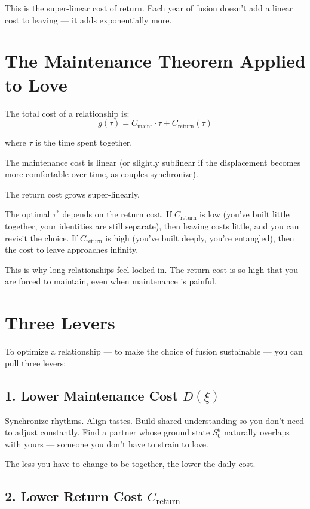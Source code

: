 \documentclass[12pt]{article}
\begin{document}
This is the super-linear cost of return. Each year of fusion doesn't add a linear cost to leaving — it adds exponentially more.

\section{The Maintenance Theorem Applied to Love}

The total cost of a relationship is:
\[
g(\tau) = C_{\text{maint}} \cdot \tau + C_{\text{return}}(\tau)
\]

where $\tau$ is the time spent together.

The maintenance cost is linear (or slightly sublinear if the displacement becomes more comfortable over time, as couples synchronize).

The return cost grows super-linearly.

The optimal $\tau^*$ depends on the return cost. If $C_{\text{return}}$ is low (you've built little together, your identities are still separate), then leaving costs little, and you can revisit the choice. If $C_{\text{return}}$ is high (you've built deeply, you're entangled), then the cost to leave approaches infinity.

This is why long relationships feel locked in. The return cost is so high that you are forced to maintain, even when maintenance is painful.

\section{Three Levers}

To optimize a relationship — to make the choice of fusion sustainable — you can pull three levers:

\subsection{1. Lower Maintenance Cost $D(\xi)$}

Synchronize rhythms. Align tastes. Build shared understanding so you don't need to adjust constantly. Find a partner whose ground state $S_0^b$ naturally overlaps with yours — someone you don't have to strain to love.

The less you have to change to be together, the lower the daily cost.

\subsection{2. Lower Return Cost $C_{\text{return}}$}
\end{document}
